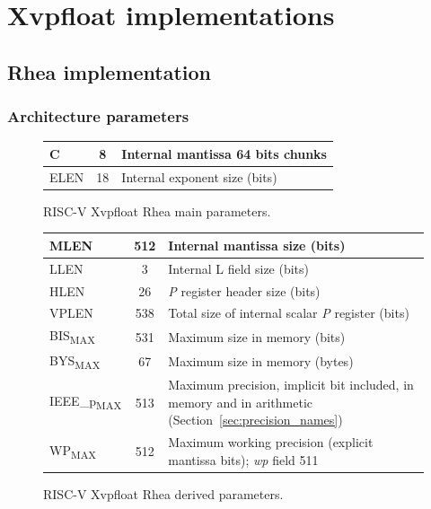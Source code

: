 \chapter{Xvpfloat implementations}

\section{Rhea implementation}

\subsection{Architecture parameters}

\begin{figure}[ht]
\begin{center}
    \begin{tabular}{|l|c|p{4in}|}
    \hline
    C & 8 & Internal mantissa 64 bits chunks \\
    \hline
    ELEN & 18 & Internal exponent size (bits)\\
    \hline
    \end{tabular}
\end{center}
\caption{RISC-V Xvpfloat Rhea main parameters.}
\label{fig:Xvpfloat_rhea_main_params}
\end{figure}

\begin{figure}[ht]
\begin{center}
    \begin{tabular}{|l|c|p{4in}|}
    \hline
    MLEN & 512 & Internal mantissa size (bits) \\
    \hline
    LLEN & 3 & Internal L field size (bits)\\
    \hline
    HLEN & 26 & {\em P} register header size (bits)\\
    \hline
    VPLEN & 538 & Total size of internal scalar {\em P} register (bits)\\
    \hline
    BIS\textsubscript{MAX} & 531 & Maximum size in memory (bits)\\
    \hline
    BYS\textsubscript{MAX} & 67 & Maximum size in memory (bytes)\\
    \hline
    IEEE\_p\textsubscript{MAX} & 513 & Maximum precision, implicit bit included, in memory and in arithmetic (Section~\ref{sec:precision_names})\\
    \hline
    WP\textsubscript{MAX} & 512 & Maximum working precision (explicit mantissa bits); {\em wp} field 511\\
    \hline
    \end{tabular}
\end{center}
\caption{RISC-V Xvpfloat Rhea derived parameters.}
\label{fig:Xvpfloat_rhea_derived_params}
\end{figure}


